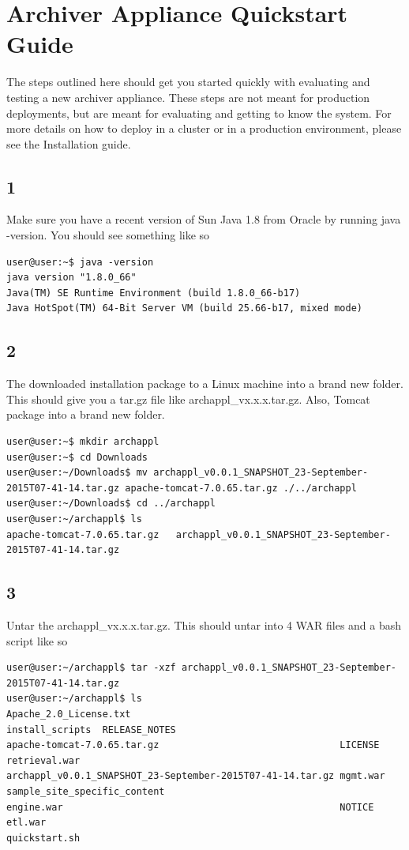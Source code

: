 \documentclass[11pt
  , a4paper
  , article
  , oneside
]{memoir}
\begin{document}
\section{Archiver Appliance Quickstart Guide}
The steps outlined here should get you started quickly with evaluating and testing a new archiver appliance. These steps are not meant for production deployments, but are meant for evaluating and getting to know the system. For more details on how to deploy in a cluster or in a production environment, please see the Installation guide.
\subsection{1}
Make sure you have a recent version of Sun Java 1.8 from Oracle by running java -version. You should see something like so
\begin{lstlisting}[style=termstyle]
user@user:~$ java -version
java version "1.8.0_66"
Java(TM) SE Runtime Environment (build 1.8.0_66-b17)
Java HotSpot(TM) 64-Bit Server VM (build 25.66-b17, mixed mode)
\end{lstlisting}
\subsection{2}
The downloaded installation package to a Linux machine into a brand new folder. This should give you a tar.gz file like archappl\_vx.x.x.tar.gz. Also, Tomcat package into a brand new folder.
\begin{lstlisting}[style=termstyle]
user@user:~$ mkdir archappl
user@user:~$ cd Downloads
user@user:~/Downloads$ mv archappl_v0.0.1_SNAPSHOT_23-September-2015T07-41-14.tar.gz apache-tomcat-7.0.65.tar.gz ./../archappl
user@user:~/Downloads$ cd ../archappl 
user@user:~/archappl$ ls
apache-tomcat-7.0.65.tar.gz   archappl_v0.0.1_SNAPSHOT_23-September-2015T07-41-14.tar.gz
\end{lstlisting}
\subsection{3}
Untar the archappl\_vx.x.x.tar.gz. This should untar into 4 WAR files and a bash script like so
\begin{lstlisting}[style=termstyle]
user@user:~/archappl$ tar -xzf archappl_v0.0.1_SNAPSHOT_23-September-2015T07-41-14.tar.gz
user@user:~/archappl$ ls
Apache_2.0_License.txt                                     install_scripts  RELEASE_NOTES
apache-tomcat-7.0.65.tar.gz                                LICENSE          retrieval.war
archappl_v0.0.1_SNAPSHOT_23-September-2015T07-41-14.tar.gz mgmt.war
sample_site_specific_content
engine.war                                                 NOTICE
etl.war                                                    quickstart.sh
\end{lstlisting}
\end{document}
